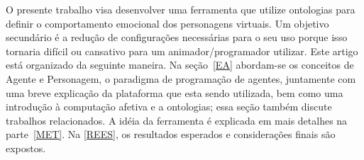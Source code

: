 O presente trabalho visa desenvolver uma ferramenta que utilize ontologias
para definir o comportamento emocional dos personagens virtuais.  Um objetivo
secundário é a redução de configurações necessárias para o seu uso porque isso
tornaria difícil ou cansativo para um animador/programador utilizar.
%
Este artigo está organizado da seguinte maneira.  Na
seção~\ref{EA} abordam-se os conceitos de Agente e Personagem, o paradigma de
programação de agentes, juntamente com uma breve explicação da plataforma que
esta sendo utilizada, bem como uma introdução à computação afetiva e a
ontologias; essa seção também discute trabalhos relacionados.  A idéia da
ferramenta é explicada em mais detalhes na parte~\ref{MET}. Na \ref{REES}, os
resultados esperados e considerações finais são expostos.
